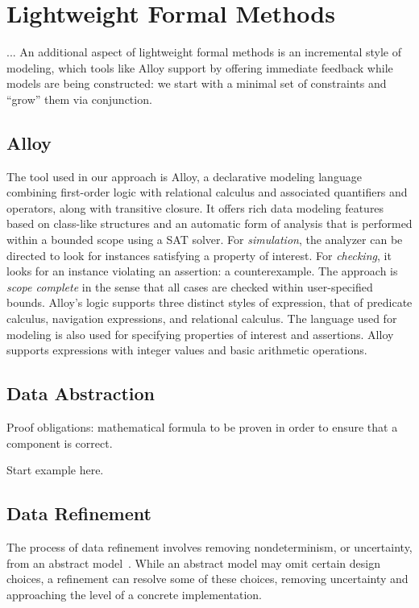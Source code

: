 \section{Lightweight Formal Methods}
\label{sec:alloy}

...
An additional aspect of lightweight formal methods is an incremental style of modeling, which tools like Alloy support by offering immediate feedback while models are being constructed: we start with a minimal set of constraints and ``grow'' them via conjunction.

\subsection{Alloy}

The tool used in our approach is Alloy, a declarative modeling language combining first-order logic with relational calculus and associated quantifiers and operators, along with transitive closure.  It offers rich data modeling features based on class-like structures and an automatic form of analysis that is performed within a bounded scope using a SAT solver.  For \emph{simulation}, the analyzer can be directed to look for instances satisfying a property of interest.  For \emph{checking}, it looks for an instance violating an assertion: a counterexample.  The approach is \emph{scope complete} in the sense that all cases are checked within user-specified bounds.  Alloy's logic supports three distinct styles of expression, that of predicate calculus, navigation expressions, and relational calculus.  The language used for modeling is also used for specifying properties of interest and assertions.  Alloy supports expressions with integer values and basic arithmetic operations.

\subsection{Data Abstraction}

Proof obligations: mathematical formula to be proven in order to ensure that a component is correct.

Start example here.

\subsection{Data Refinement}

The process of data refinement involves removing nondeterminism, or uncertainty, from an abstract model~\cite{woodcock1996}.  While an abstract model may omit certain design choices, a refinement can resolve some of these choices, removing uncertainty and approaching the level of a concrete implementation.

